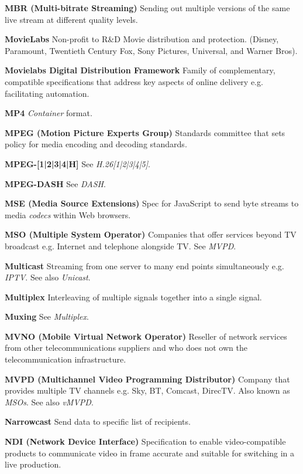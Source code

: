 \smallskip
\textbf{MBR (Multi-bitrate Streaming)}
Sending out multiple versions of the same live stream at different quality levels.

\smallskip
\textbf{MovieLabs}
Non-profit to R\&D Movie distribution and protection. (Disney, Paramount, Twentieth Century Fox, Sony Pictures, Universal, and Warner Bros).

\smallskip
\textbf{Movielabs Digital Distribution Framework}
Family of complementary, compatible specifications that address key aspects of online delivery e.g. facilitating automation.

\smallskip
\textbf{MP4}
\textit{Container} format.

\smallskip
\textbf{MPEG (Motion Picture Experts Group)}
Standards committee that sets policy for media encoding and decoding standards.

\smallskip
\textbf{MPEG-[1|2|3|4|H]}
See \textit{H.26[1|2|3|4|5]}.

\smallskip
\textbf{MPEG-DASH}
See \textit{DASH}.

\smallskip
\textbf{MSE (Media Source Extensions)}
Spec for JavaScript to send byte streams to media \textit{codecs} within Web browsers.

\smallskip
\textbf{MSO (Multiple System Operator)}
Companies that offer services beyond TV broadcast e.g. Internet and telephone alongside TV.  See \textit{MVPD}.

\smallskip
\textbf{Multicast}
Streaming from one server to many end points simultaneously e.g. \textit{IPTV}.  See also \textit{Unicast}.

\smallskip
\textbf{Multiplex}
Interleaving of multiple signals together into a single signal.

\smallskip
\textbf{Muxing}
See \textit{Multiplex}.

\smallskip
\textbf{MVNO (Mobile Virtual Network Operator)}
Reseller of network services from other telecommunications suppliers and who does not own the telecommunication infrastructure.

\smallskip
\textbf{MVPD (Multichannel Video Programming Distributor)}
Company that provides multiple TV channels e.g. Sky, BT, Comcast, DirecTV. Also known as \textit{MSOs}. See also \textit{vMVPD}.

\smallskip
\textbf{Narrowcast}
Send data to specific list of recipients.

\smallskip
\textbf{NDI (Network Device Interface)}
Specification to enable video-compatible products to communicate video in frame accurate and suitable for switching in a live production.

